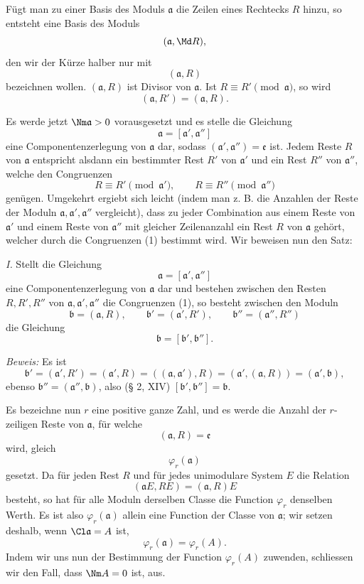Fügt man zu einer Basis des Moduls $\mathfrak a$ die Zeilen eines Rechtecks $R$ hinzu, so entsteht eine Basis des Moduls
\[
 (\mathfrak a,\Md R),
\]
den wir der Kürze halber nur mit
\[
 (\mathfrak a,R)
\]
bezeichnen wollen. $(\mathfrak a,R)$ ist Divisor von $\mathfrak a$. Ist $R\equiv R'\pmod{\mathfrak a}$, so wird
\[
 (\mathfrak a,R')=(\mathfrak a,R).
\]

Es werde jetzt $\Nm\mathfrak a>0$ vorausgesetzt und es stelle die Gleichung
\[
 \mathfrak a=[\mathfrak a',\mathfrak a'']
\]
eine Componentenzerlegung von $\mathfrak a$ dar, sodass $(\mathfrak a',\mathfrak a'')=\mathfrak e$ ist. Jedem Reste $R$ von $\mathfrak a$ entspricht alsdann ein bestimmter Rest $R'$ von $\mathfrak a'$ und ein Rest $R''$ von $\mathfrak a''$, welche den Congruenzen
\begin{equation}
 R\equiv R'\pmod{\mathfrak a'},
 \qquad
 R\equiv R''\pmod{\mathfrak a''}
\tag{1}
\end{equation}
genügen. Umgekehrt ergiebt sich leicht (indem man z. B. die Anzahlen der Reste der Moduln $\mathfrak a,\mathfrak a',\mathfrak a''$ vergleicht), dass zu jeder Combination aus einem Reste von $\mathfrak a'$ und einem Reste von $\mathfrak a''$ mit gleicher Zeilenanzahl ein Rest $R$ von $\mathfrak a$ gehört, welcher durch die Congruenzen (1) bestimmt wird. Wir beweisen nun den Satz:

\emph{I.} Stellt die Gleichung
\[
 \mathfrak a=[\mathfrak a',\mathfrak a'']
\]
eine Componentenzerlegung von $\mathfrak a$ dar und bestehen zwischen den Resten $R,R',R''$ von $\mathfrak a,\mathfrak a',\mathfrak a''$ die Congruenzen (1), so besteht zwischen den Moduln
\[
 \mathfrak b=(\mathfrak a,R),
 \qquad
 \mathfrak b'=(\mathfrak a',R'),
 \qquad
 \mathfrak b''=(\mathfrak a'',R'')
\]
die Gleichung
\[
 \mathfrak b=[\mathfrak b',\mathfrak b''].
\]

\emph{Beweis:} Es ist
\[
 \mathfrak b'=(\mathfrak a',R')=(\mathfrak a',R)=((\mathfrak a,\mathfrak a'),R)
 =(\mathfrak a',(\mathfrak a,R))=(\mathfrak a',\mathfrak b),
\]
ebenso $\mathfrak b''=(\mathfrak a'',\mathfrak b)$, also (§ 2, XIV) $[\mathfrak b',\mathfrak b'']=\mathfrak b$.

Es bezeichne nun $r$ eine positive ganze Zahl, und es werde die Anzahl der $r$-zeiligen Reste von $\mathfrak a$, für welche
\[
 (\mathfrak a,R)=\mathfrak e
\]
wird, gleich
\[
 \varphi_r(\mathfrak a)
\]
gesetzt. Da für jeden Rest $R$ und für jedes unimodulare System $E$ die Relation
\[
 (\mathfrak aE,RE)=(\mathfrak a,R)E
\]
besteht, so hat für alle Moduln derselben Classe die Function $\varphi_r$ denselben Werth. Es ist also $\varphi_r(\mathfrak a)$ allein eine Function der Classe von $\mathfrak a$; wir setzen deshalb, wenn $\Cl\mathfrak a=A$ ist,
\[
 \varphi_r(\mathfrak a)=\varphi_r(A).
\]
Indem wir uns nun der Bestimmung der Function $\varphi_r(A)$ zuwenden, schliessen wir den Fall, dass $\Nm A=0$ ist, aus.

